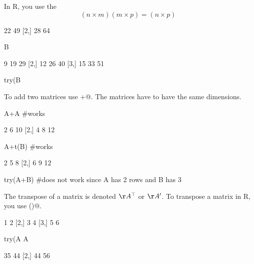 In R, you use the \verb@%*%@ operation to do matrix multiplication.  When you do matrix multiplication, the columns of the matrix on the left must equal the rows of the matrix on the right.  The result is a matrix that has the number of rows of the matrix on the left and number of columns of the matrix on the right.
$$(n \times m)(m \times p) = (n \times p)$$
\begin{Schunk}
\begin{Soutput}
     [,1] [,2]
[1,]   22   49
[2,]   28   64
\end{Soutput}
\begin{Sinput}
 B%*%A #this works
\end{Sinput}
\begin{Soutput}
     [,1] [,2] [,3]
[1,]    9   19   29
[2,]   12   26   40
[3,]   15   33   51
\end{Soutput}
\begin{Sinput}
 try(B%*%B) #this doesn't
\end{Sinput}
\end{Schunk}
To add two matrices use \verb@+@. The matrices have to have the same dimensions.
\begin{Schunk}
\begin{Sinput}
 A+A #works
\end{Sinput}
\begin{Soutput}
     [,1] [,2] [,3]
[1,]    2    6   10
[2,]    4    8   12
\end{Soutput}
\begin{Sinput}
 A+t(B) #works
\end{Sinput}
\begin{Soutput}
     [,1] [,2] [,3]
[1,]    2    5    8
[2,]    6    9   12
\end{Soutput}
\begin{Sinput}
 try(A+B) #does not work since A has 2 rows and B has 3
\end{Sinput}
\end{Schunk}
The transpose of a matrix is denoted $\AA^\top$ or $\AA^\prime$.  To transpose a matrix in R, you use \verb@t()@.
\begin{Schunk}
\begin{Soutput}
     [,1] [,2]
[1,]    1    2
[2,]    3    4
[3,]    5    6
\end{Soutput}
\begin{Sinput}
 try(A%*%A) #this won't work
 A%*%t(A) #this will
\end{Sinput}
\begin{Soutput}
     [,1] [,2]
[1,]   35   44
[2,]   44   56
\end{Soutput}
\end{Schunk}


